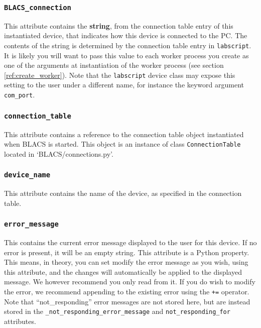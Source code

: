 \documentclass[12pt]{article}
\begin{document}
\subsubsection{\texttt{BLACS\_connection}}\label{ref:BLACS_connection}
This attribute contains the \textbf{string}, from the connection table entry of this instantiated device, that indicates how this device is connected to the PC. 
The contents of the string is determined by the connection table entry in \texttt{labscript}.
It is likely you will want to pass this value to each worker process you create as one of the arguments at instantiation of the worker process (see section \ref{ref:create_worker}).
Note that the \texttt{labscript} device class may expose this setting to the user under a different name, for instance the keyword argument \texttt{com\_port}.

\subsubsection{\texttt{connection\_table}}\label{ref:_connection_table}
This attribute contains a reference to the connection table object instantiated when BLACS is started.
This object is an instance of class \texttt{ConnectionTable} located in `BLACS/connections.py'.

\subsubsection{\texttt{device\_name}}\label{ref:device_name}
This attribute contains the name of the device, as specified in the connection table.

\subsubsection{\texttt{error\_message}}\label{ref:error_message}
This contains the current error message displayed to the user for this device.
If no error is present, it will be an empty string.
This attribute is a Python property. 
This means, in theory, you can set modify the error message as you wish, using this attribute, and the changes will automatically be applied to the displayed message.
We however recommend you only read from it.
If you do wish to modify the error, we recommend appending to the existing error using the \texttt{+=} operator.
Note that ``not\_responding'' error messages are not stored here, but are instead stored in the \texttt{\_not\_responding\_error\_message} and \texttt{not\_responding\_for} attributes.
\end{document}
